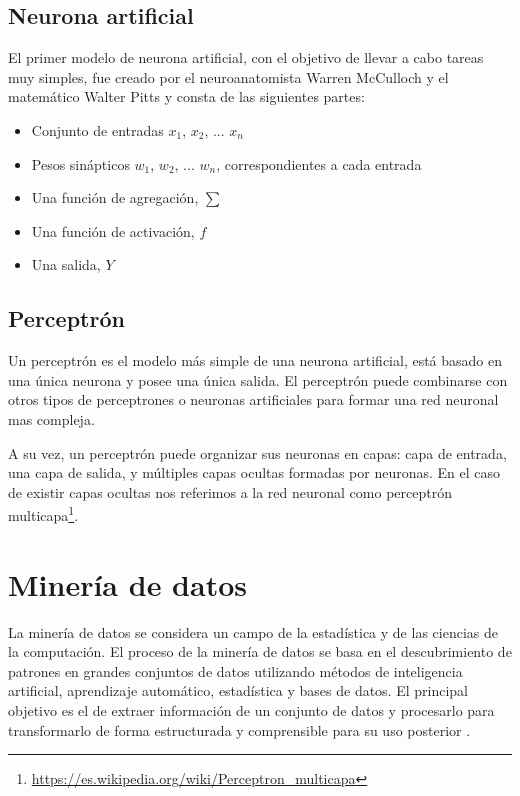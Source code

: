\subsection{Neurona artificial}
El primer modelo de neurona artificial, con el objetivo de llevar a cabo tareas muy simples, fue creado por el neuroanatomista Warren McCulloch y el matemático Walter Pitts y consta de las siguientes partes:
\begin{itemize}
    \item Conjunto de entradas $x_1$, $x_2$, ... $x_n$
    \item Pesos sinápticos $w_1$, $w_2$, ... $w_n$, correspondientes a cada entrada
    \item Una función de agregación, $\sum$
    \item Una función de activación, $f$
    \item Una salida, $Y$
\end{itemize}

\subsection{Perceptrón}
 Un perceptrón es el modelo más simple de una neurona artificial, está basado en una única neurona y posee una única salida. El perceptrón puede combinarse con otros tipos de perceptrones o neuronas artificiales para formar una red neuronal mas compleja.
 
 A su vez, un perceptrón puede organizar sus neuronas en capas: capa de entrada, una capa de salida, y múltiples capas ocultas formadas por neuronas. En el caso de existir capas ocultas nos referimos a la red neuronal como perceptrón multicapa\footnote{\url{https://es.wikipedia.org/wiki/Perceptron\_multicapa}}.


\section{Minería de datos}

La minería de datos se considera un campo de la estadística y de las ciencias de la computación. El proceso de la minería de datos se basa en el descubrimiento de patrones en grandes conjuntos de datos utilizando métodos de inteligencia artificial, aprendizaje automático, estadística y bases de datos. El principal objetivo es el de extraer información de un conjunto de datos y procesarlo para transformarlo de forma estructurada y comprensible para su uso posterior \cite{wiki:mineria_de_datos}.

